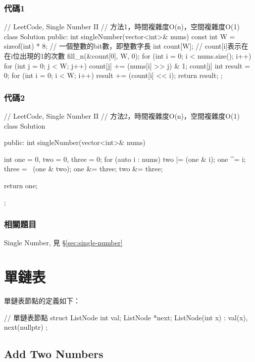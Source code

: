 \subsubsection{代碼1}
\begin{Code}
// LeetCode, Single Number II
// 方法1，時間複雜度O(n)，空間複雜度O(1)
class Solution {
public:
    int singleNumber(vector<int>& nums) {
        const int W = sizeof(int) * 8; // 一個整數的bit數，即整數字長
        int count[W];  // count[i]表示在在i位出現的1的次數
        fill_n(&count[0], W, 0);
        for (int i = 0; i < nums.size(); i++) {
            for (int j = 0; j < W; j++) {
                count[j] += (nums[i] >> j) & 1;
                count[j] %
            }
        }
        int result = 0;
        for (int i = 0; i < W; i++) {
            result += (count[i] << i);
        }
        return result;
    }
};
\end{Code}


\subsubsection{代碼2}
\begin{Code}
// LeetCode, Single Number II
// 方法2，時間複雜度O(n)，空間複雜度O(1)
class Solution {
public:
    int singleNumber(vector<int>& nums) {
        int one = 0, two = 0, three = 0;
        for (auto i : nums) {
            two |= (one & i);
            one ^= i;
            three = ~(one & two);
            one &= three;
            two &= three;
        }

        return one;
    }
};
\end{Code}


\subsubsection{相關題目}
\begindot
\item  Single Number, 見 \S \ref{sec:single-number}
\myenddot


\section{單鏈表} %

單鏈表節點的定義如下：
\begin{Code}
// 單鏈表節點
struct ListNode {
    int val;
    ListNode *next;
    ListNode(int x) : val(x), next(nullptr) { }
};
\end{Code}


\subsection{Add Two Numbers}
\label{sec:add-two-numbers}


